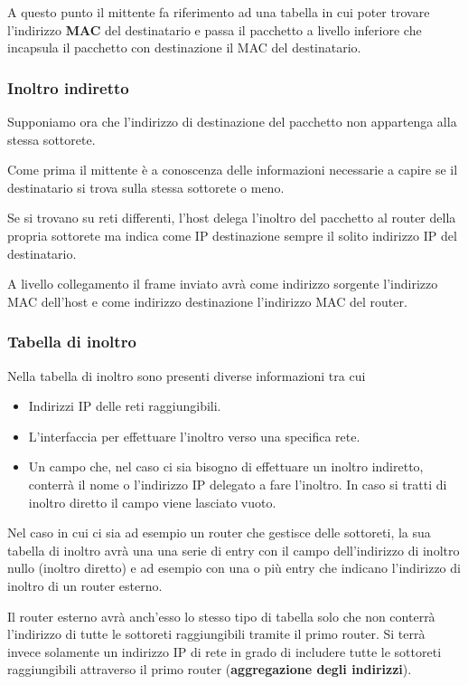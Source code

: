 A questo punto il mittente fa riferimento ad una tabella in cui poter
trovare l'indirizzo \textbf{MAC} del destinatario e passa il pacchetto
a livello inferiore che incapsula il pacchetto con destinazione il 
MAC del destinatario.

\subsubsection{Inoltro indiretto}
Supponiamo ora che l'indirizzo di destinazione del pacchetto non 
appartenga alla stessa sottorete.

Come prima il mittente è a conoscenza delle informazioni necessarie a
capire se il destinatario si trova sulla stessa sottorete o meno.

Se si trovano su reti differenti, l'host delega l'inoltro del 
pacchetto al router della propria sottorete ma indica come IP
destinazione sempre il solito indirizzo IP del destinatario.

A livello collegamento il frame inviato avrà come indirizzo sorgente
l'indirizzo MAC dell'host e come indirizzo destinazione l'indirizzo 
MAC del router.

\subsubsection{Tabella di inoltro}
Nella tabella di inoltro sono presenti diverse informazioni tra cui
\begin{itemize}
	\item Indirizzi IP delle reti raggiungibili.
	\item L'interfaccia per effettuare l'inoltro verso una specifica
		rete.
	\item Un campo che, nel caso ci sia bisogno di effettuare un 
		inoltro indiretto, conterrà il nome o l'indirizzo IP delegato
		a fare l'inoltro. In caso si tratti di inoltro diretto il 
		campo viene lasciato vuoto.
\end{itemize}
Nel caso in cui ci sia ad esempio un router che gestisce delle 
sottoreti, la sua tabella di inoltro avrà una una serie di entry con
il campo dell'indirizzo di inoltro nullo (inoltro diretto) e ad 
esempio con una o più entry che indicano l'indirizzo di inoltro di 
un router
esterno.

Il router esterno avrà anch'esso lo stesso tipo di tabella solo che 
non conterrà l'indirizzo di tutte le sottoreti raggiungibili tramite
il primo router. Si terrà invece solamente un indirizzo IP di rete in
grado di includere tutte le sottoreti raggiungibili attraverso il 
primo router (\textbf{aggregazione degli indirizzi}).


